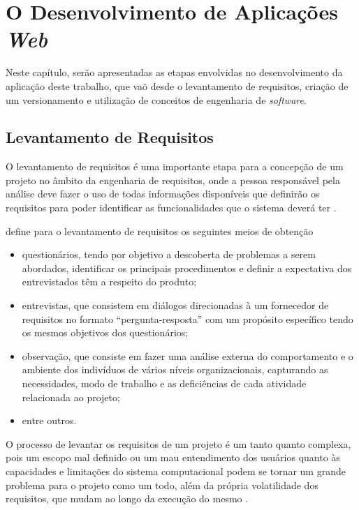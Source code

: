\chapter{O Desenvolvimento de Aplicações \textit{Web}}
\label{c:o_desenvolvimento_de_aplicacoes_web}

Neste capítulo, serão apresentadas as etapas envolvidas no desenvolvimento da aplicação deste trabalho, que vaõ desde o levantamento de requisitos, criação de um versionamento e utilização de conceitos de engenharia de \textit{software}.

\section{Levantamento de Requisitos}

O levantamento de requisitos é uma importante etapa para a concepção de um projeto no âmbito da engenharia de requisitos, onde a pessoa responsável pela análise deve fazer o uso de todas informações disponíveis que definirão os requisitos para poder identificar as funcionalidades que o sistema deverá ter \cite{wazlawick2013engenharia}.

\cite{bezerra2016principios} define para o levantamento de requisitos os seguintes meios de obtenção 
\begin{itemize}
    \item questionários, tendo por objetivo a descoberta de problemas a serem abordados, identificar os principais procedimentos e definir a expectativa dos entrevistados têm a respeito do produto;
    \item entrevistas, que consistem em diálogos direcionadas à um fornecedor de requisitos no formato “pergunta-resposta” com um propósito específico tendo os mesmos objetivos dos questionários;
    \item observação, que consiste em fazer uma análise externa do comportamento e o ambiente dos indivíduos de vários níveis organizacionais, capturando as necessidades, modo de trabalho e as deficiências de cada atividade relacionada ao projeto; 
    \item entre outros.
\end{itemize}

O processo de levantar os requisitos de um projeto é um tanto quanto complexa, pois um escopo mal definido ou um mau entendimento dos usuários quanto às capacidades e limitações do sistema computacional  podem se tornar um grande problema para o projeto como um todo, além da própria volatilidade dos requisitos, que mudam ao longo da execução do mesmo \cite{pressman2016engenharia}.


